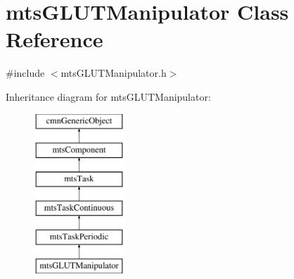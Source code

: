 \hypertarget{classmts_g_l_u_t_manipulator}{\section{mts\-G\-L\-U\-T\-Manipulator Class Reference}
\label{classmts_g_l_u_t_manipulator}
}


{\ttfamily \#include $<$mts\-G\-L\-U\-T\-Manipulator.\-h$>$}

Inheritance diagram for mts\-G\-L\-U\-T\-Manipulator\-:\begin{figure}[H]
\begin{center}
\leavevmode
\includegraphics[height=6.000000cm]{d6/d4e/classmts_g_l_u_t_manipulator}
\end{center}
\end{figure}
